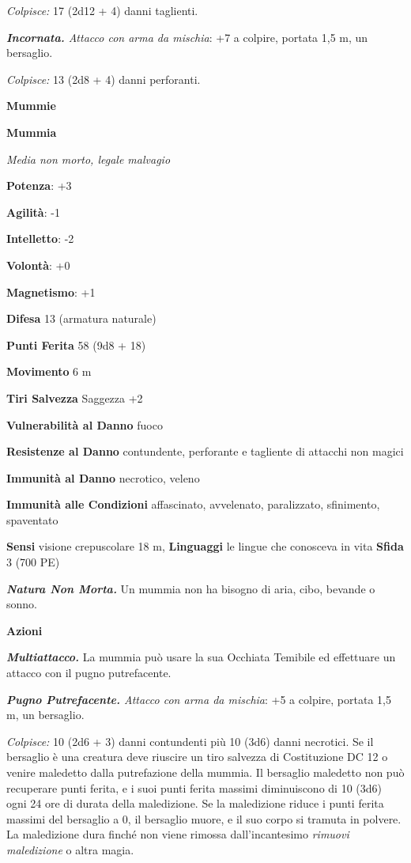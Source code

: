 \begin{multicols}{2}
\emph{Colpisce:} 17 (2d12 + 4) danni taglienti.

\emph{\textbf{Incornata.} Attacco con arma da mischia}: +7 a colpire,
portata 1,5 m, un bersaglio.

\emph{Colpisce:} 13 (2d8 + 4) danni perforanti.

\textbf{Mummie}

\textbf{Mummia}

\emph{Media non morto, legale malvagio}

\textbf{Potenza}: +3

\textbf{Agilità}: -1

\textbf{Intelletto}: -2

\textbf{Volontà}: +0

\textbf{Magnetismo}: +1

\textbf{Difesa} 13 (armatura naturale)

\textbf{Punti Ferita} 58 (9d8 + 18)

\textbf{Movimento} 6 m

\textbf{Tiri Salvezza} Saggezza +2

\textbf{Vulnerabilità al Danno} fuoco

\textbf{Resistenze al Danno} contundente, perforante e tagliente di
attacchi non magici

\textbf{Immunità al Danno} necrotico, veleno

\textbf{Immunità alle Condizioni} affascinato, avvelenato, paralizzato,
sfinimento, spaventato

\textbf{Sensi} visione crepuscolare 18 m, 
\textbf{Linguaggi} le lingue che conosceva in vita \textbf{Sfida} 3 (700
PE)

\emph{\textbf{Natura Non Morta.}} Un mummia non ha bisogno di aria,
cibo, bevande o sonno.

\textbf{Azioni}

\emph{\textbf{Multiattacco.}} La mummia può usare la sua Occhiata
Temibile ed effettuare un attacco con il pugno putrefacente.

\emph{\textbf{Pugno Putrefacente.} Attacco con arma da mischia}: +5 a
colpire, portata 1,5 m, un bersaglio.

\emph{Colpisce:} 10 (2d6 + 3) danni contundenti più 10 (3d6) danni
necrotici. Se il bersaglio è una creatura deve riuscire un tiro salvezza
di Costituzione DC 12 o venire maledetto dalla putrefazione della
mummia. Il bersaglio maledetto non può recuperare punti ferita, e i suoi
punti ferita massimi diminuiscono di 10 (3d6) ogni 24 ore di durata
della maledizione. Se la maledizione riduce i punti ferita massimi del
bersaglio a 0, il bersaglio muore, e il suo corpo si tramuta in polvere.
La maledizione dura finché non viene rimossa dall'incantesimo
\emph{rimuovi maledizione} o altra magia.


\end{multicols}
